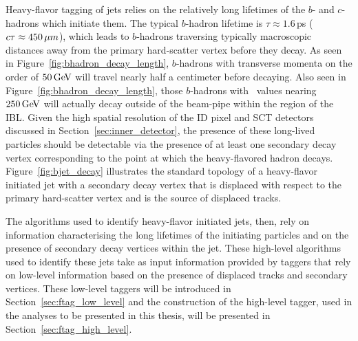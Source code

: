 Heavy-flavor tagging of jets relies on the relatively long lifetimes of the $b$- and $c$-hadrons which
initiate them. The typical $b$-hadron lifetime is $\tau \approx 1.6$\,ps ($c\tau \approx 450\,\mu m$),
which leads to $b$-hadrons traversing typically macroscopic distances away from the primary hard-scatter vertex
before they decay.
As seen in Figure~\ref{fig:bhadron_decay_length}, $b$-hadrons with transverse momenta on the order of
$50\,\text{Ge\kern -0.1em V}$ will travel nearly half a centimeter before decaying.
Also seen in Figure~\ref{fig:bhadron_decay_length}, those $b$-hadrons with \pT~values nearing $250\,\text{Ge\kern -0.1em V}$ will actually decay
outside of the beam-pipe within the region of the IBL.
Given the high spatial resolution of the ID pixel and SCT detectors discussed in Section~\ref{sec:inner_detector}, the presence of these long-lived particles
should be detectable via the presence of at least one secondary decay vertex corresponding to the point at which
the heavy-flavored hadron decays.
Figure~\ref{fig:bjet_decay} illustrates the standard topology of a heavy-flavor initiated jet with a secondary decay vertex that is displaced
with respect to the primary hard-scatter vertex and is the source of displaced tracks.

The algorithms used to identify heavy-flavor initiated jets, then, rely on information characterising
the long lifetimes of the initiating particles and on the presence of secondary decay vertices within the jet.
These high-level algorithms used to identify these jets take as input information provided by taggers that rely on low-level information based on
the presence of displaced tracks and secondary vertices.
These low-level taggers will be introduced in Section~\ref{sec:ftag_low_level} and the construction of the
high-level tagger, used in the analyses to be presented in this thesis, will be presented in Section~\ref{sec:ftag_high_level}.





